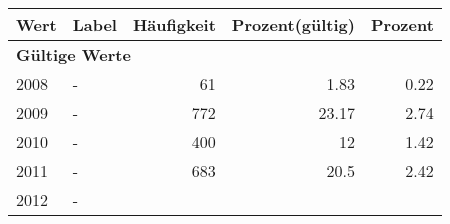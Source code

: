      \begin{longtable}{lXrrr}
     \toprule
     \textbf{Wert} & \textbf{Label} & \textbf{Häufigkeit} & \textbf{Prozent(gültig)} & \textbf{Prozent} \\
     \endhead
     \midrule
     \multicolumn{5}{l}{\textbf{Gültige Werte}}\\

     2008 &
     \multicolumn{1}{X}{ -  } &


       \num{61} &
       \num[round-mode=places,round-precision=2]{1,83} &
         \num[round-mode=places,round-precision=2]{0,22} \\

     2009 &
     \multicolumn{1}{X}{ -  } &


       \num{772} &
       \num[round-mode=places,round-precision=2]{23,17} &
         \num[round-mode=places,round-precision=2]{2,74} \\

     2010 &
     \multicolumn{1}{X}{ -  } &


       \num{400} &
       \num[round-mode=places,round-precision=2]{12} &
         \num[round-mode=places,round-precision=2]{1,42} \\

     2011 &
     \multicolumn{1}{X}{ -  } &


       \num{683} &
       \num[round-mode=places,round-precision=2]{20,5} &
         \num[round-mode=places,round-precision=2]{2,42} \\

     2012 &
     \multicolumn{1}{X}{ -  } &



\end{longtable}
